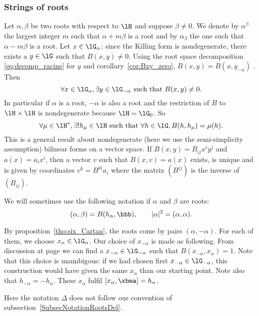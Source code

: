 \subsubsection{Strings of roots}


Let $\alpha,\beta$ be two roots with respect to $\lH$ and suppose $\beta\neq 0$. We denote by $\alpha^{\beta}$ the largest integer $m$ such that $\alpha+m\beta$ is a root and by $\alpha_{\beta}$ the one such that $\alpha-m\beta$ is a root. Let $x\in\lG_{\alpha}$; since the Killing form is nondegenerate, there exists a $y\in\lG$ such that $B(x,y)\neq 0$. Using the root space decomposition \eqref{eq:decomp_racine} for $y$ and corollary~\ref{cor:Bxy_zero}, $B(x,y)=B(x,y_{-\alpha})$ . Then \label{pg:root_ss}
\[
\forall x\in\lG_{\alpha},\exists y\in\lG_{-\alpha}\textrm{ such that } B(x,y)\neq 0.
\]
In particular if $\alpha$ is a root, $-\alpha$ is also a root and the restriction of $B$ to $\lH\times\lH$ is nondegenerate because $\lH=\lG_0$. So
\[
\forall\mu\in\lH^*,\exists!h_{\mu}\in\lH\textrm{ such that } \forall h\in\lG, B(h,h_{\mu})=\mu(h).
\]
This is a general result about nondegenerate (here we use the semi-simplicity assumption) bilinear forms on a vector space. If $B(x,y)=B_{ij}x^iy^j$ and $a(x)=a_ix^i$, then a vector $v$ such that $B(x,v)=a(x)$ exists, is unique and is given by coordinates $v^k=B^{ki}a_i$ where the matrix $(B^{ij})$ is the inverse of $(B_{ij})$.

We will sometimes use the following notation if $\alpha$ and $\beta$ are roots:
\[
(\alpha,\beta)=B( h_{\alpha},\hbb),\qquad |\alpha|^2=(\alpha,\alpha).
\]

By proposition~\ref{tho:six_Cartan}, the roots come by pairs $(\alpha,-\alpha)$. For each of them, we choose $x_{\alpha}\in\lG_{\alpha}$. Our choice of $x_{-\alpha}$ is made as following. From discussion at page \pageref{pg:root_ss} we can find a $x_{-\alpha}\in\lG_{-\alpha}$ such that $B(x_{-\alpha},x_{\alpha})=1$. Note that this choice is unambigous: if we had chosen first $x_{-\alpha}\in\lG_{-\alpha}$, this construction would have given the same $x_{\alpha}$ than our starting point. Note also that $h_{-\alpha}=-h_{\alpha}$. These $ x_{\alpha}$ fulfil $[ x_{\alpha},\xbma]= h_{\alpha}$.

\begin{probleme}
    Here the notation \( \Delta\) does not follow our convention of subsection~\ref{SubsecNotationRootsDel}.
\end{probleme}

